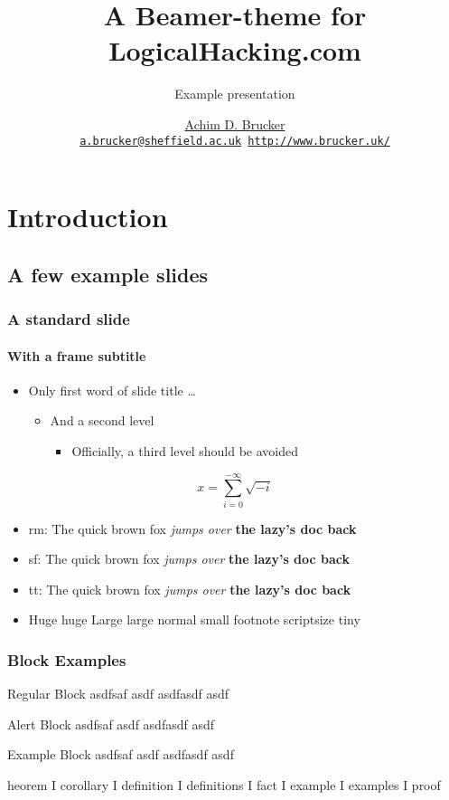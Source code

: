 \documentclass[inverse,aspectratio=169,classification=confidential]{lh-presentation}
\title{A Beamer-theme for LogicalHacking.com}
\subtitle{Example presentation}
\institute[The University of Sheffield]
{Department of Computer Science, The University of Sheffield, Sheffield, UK}
\author[A.D. Brucker] {%
    \href{http://www.brucker.uk/}{Achim D. Brucker}\\
    \texttt{\footnotesize\href{mailto:"Achim D. Brucker"
        <a.brucker@sheffield.ac.uk>}{a.brucker@sheffield.ac.uk}
      \hspace{.6cm}
      \url{http://www.brucker.uk/}}
    }
\begin{document}
\begin{frame}[plain]
  \maketitle
\end{frame}

\AgendaFrame

\section{Introduction}
\subsection{A few example slides}
\frame{\sectionpage}
\begin{frame}[classification={confidential}]
  \frametitle{A standard slide}
  \framesubtitle{With a frame subtitle}
  \begin{itemize}
  \item Only first word of slide title \ldots
    \begin{itemize}
    \item  And a second level 
      \begin{itemize}
      \item  Officially, a third level should be avoided
      \end{itemize}
    \end{itemize}
  \end{itemize}
  \[ x = \sum_{i=0}^{-\infty}\sqrt{-i}\]
\begin{itemize}
\item rm: {\rmfamily The quick {\mdseries brown fox} \emph{jumps over} \textbf{the lazy's doc back}}
\item sf: {\sffamily The quick {\mdseries brown fox} \emph{jumps over} \textbf{the lazy's doc back}}
\item tt: {\ttfamily The quick {\mdseries brown fox} \emph{jumps over} \textbf{the lazy's doc back}}
\item {\Huge Huge} {\huge huge} {\Large Large} {\large large} {\normalsize normal} {\small small} 
      {\footnotesize footnote} {\scriptsize scriptsize} {\tiny tiny}
\end{itemize}
\end{frame}

\begin{frame}
\frametitle{Block Examples}
\begin{block}{Regular Block}
asdfsaf asdf asdfasdf asdf 
\end{block}
\begin{alertblock}{Alert Block}
asdfsaf asdf asdfasdf asdf 
\end{alertblock}
\begin{exampleblock}{Example Block}
asdfsaf asdf asdfasdf asdf 
\end{exampleblock}
heorem
I
corollary
I
definition
I
definitions
I
fact
I
example
I
examples
I
proof

\end{frame}
\end{document}
